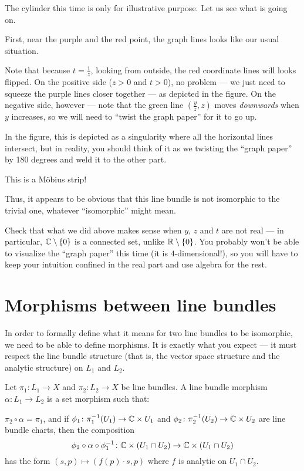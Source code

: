 The cylinder this time is only for illustrative purpose. Let us see what is going on.
\begin{itemize}
	\ii First, near the purple and the red point, the graph lines looks like our usual situation.

	Note that because $t = \frac{1}{z}$, looking from outside, the red coordinate lines will looks
	flipped.
	\ii On the positive side ($z > 0$ and $t > 0$), no problem --- we just need to squeeze the
	purple lines closer together --- as depicted in the figure.
	\ii On the negative side, however --- note that the green line $(\frac{y}{z}, z)$ moves
	\emph{downwards} when $y$ increases, so we will need to ``twist the graph paper'' for it to go
	up.

	In the figure, this is depicted as a singularity where all the horizontal lines intersect, but
	in reality, you should think of it as we twisting the ``graph paper'' by 180 degrees
	and weld it to the other part.
\end{itemize}

This is a M\"obius strip!

Thus, it appears to be obvious that this line bundle is not isomorphic to the trivial one,
whatever ``isomorphic'' might mean.

\begin{ques}
	Check that what we did above makes sense when $y$, $z$ and $t$ are not real --- in particular,
	$\mathbb C \setminus \{ 0 \}$ is a connected set, unlike $\mathbb R \setminus \{ 0 \}$.
	You probably won't be able to visualize the ``graph paper'' this time (it is
	$4$-dimensional!), so you will have to keep your intuition confined in the real part and use
	algebra for the rest.
\end{ques}

\section{Morphisms between line bundles}

In order to formally define what it means for two line bundles to be isomorphic, we need to be able
to define morphisms.
It is exactly what you expect --- it must respect the line bundle structure (that is, the vector
space structure and the analytic structure) on $L_1$ and $L_2$.

\begin{definition}
	Let $\pi_1 \colon L_1 \to X$ and $\pi_2 \colon L_2 \to X$ be line bundles.
	A line bundle morphism $\alpha \colon L_1 \to L_2$ is a set morphism such that:
	\begin{itemize}
		\ii $\pi_2 \circ \alpha = \pi_1$, and
		\ii if $\phi_1 \colon \pi_1^{-1}(U_1) \to \mathbb C \times U_1$
		and $\phi_2 \colon \pi_2^{-1}(U_2) \to \mathbb C \times U_2$
		are line bundle charts, then the composition
		\[ \phi_2 \circ \alpha \circ \phi_1^{-1} \colon
			\mathbb C \times (U_1 \cap U_2) \to \mathbb C \times (U_1 \cap U_2) \]
		has the form $(s, p) \mapsto (f(p) \cdot s, p)$ where $f$ is analytic on $U_1 \cap U_2$.
	\end{itemize}
\end{definition}

